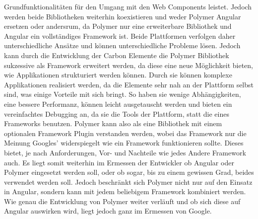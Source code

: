 Grundfunktionalitäten für den Umgang mit den Web Components leistet.
Jedoch werden beide Bibliotheken weiterhin koexistieren und weder
Polymer Angular ersetzen oder andersrum, da Polymer nur eine
erweiterbare Bibliothek und Angular ein vollständiges Framework ist.
Beide Plattformen verfolgen daher unterschiedliche Ansätze und können
unterschiedliche Probleme lösen. Jedoch kann durch die Entwicklung der
Carbon Elemente die Polymer Bibliothek sukzessive als Framework
erweitert werden, da diese eine neue Möglichkeit bieten, wie
Applikationen strukturiert werden können. Durch sie können komplexe
Applikationen realisiert werden, da die Elemente sehr nah an der
Plattform selbst sind, was einige Vorteile mit sich bringt. So haben sie
wenige Abhängigkeiten, eine bessere Performanz, können leicht
ausgetauscht werden und bieten ein vereinfachtes Debugging an, da sie
die Tools der Plattform, statt die eines Frameworks benutzen. Polymer
kann also als eine Bibliothek mit einem optionalen Framework Plugin
verstanden werden, wobei das Framework nur die Meinung Googles'
widerspiegelt wie ein Framework funktionieren sollte. Dieses bietet, je
nach Anforderungen, Vor- und Nachteile wie jedes Andere Framework auch.
Es liegt somit weiterhin im Ermessen der Entwickler ob Angular oder
Polymer eingesetzt werden soll, oder ob sogar, bis zu einem gewissen
Grad, beides verwendet werden soll. Jedoch beschränkt sich Polymer nicht
nur auf den Einsatz in Angular, sondern kann mit jedem beliebigem
Framework kombiniert werden. Wie genau die Entwicklung von Polymer
weiter verläuft und ob sich diese auf Angular auswirken wird, liegt
jedoch ganz im Ermessen von Google.
